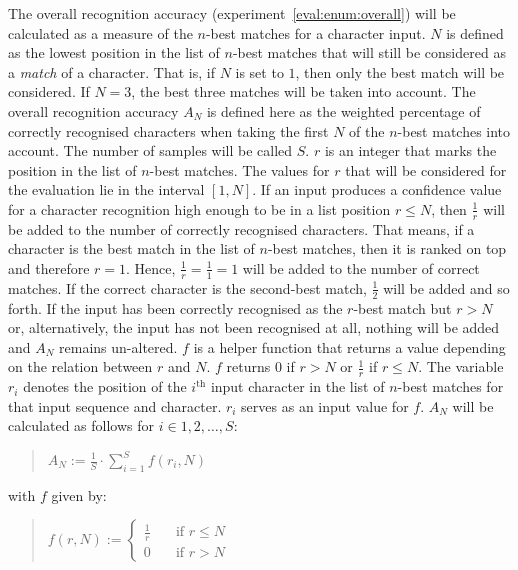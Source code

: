 The overall recognition accuracy (experiment~\ref{eval:enum:overall}) will 
be calculated as a measure of the \(n\)-best matches for a character input. 
\(N\) is defined as the lowest position in the list of \(n\)-best matches 
that will still be considered as a \emph{match} of a character. 
That is, if \(N\) is set to \(1\), then only the best match will be considered.
If \(N = 3\), the best three matches will be taken into account.
The overall recognition accuracy \(A_{N}\) is defined here as the weighted 
percentage of correctly recognised characters when taking the first \(N\) 
of the \(n\)-best matches into account. 
The number of samples will be called \(S\).
\(r\) is an integer that marks the position in the list of \(n\)-best matches.
The values for \(r\) that will be considered for the evaluation lie 
in the interval \([1,N]\). If an input produces a confidence value 
for a character recognition high enough to be in a list position \(r \leq N\), 
then \(\frac{1}{r}\) will be added to the number of correctly 
recognised characters.
That means, if a character is the best match in the list of \(n\)-best matches,
then it is ranked on top and therefore \(r = 1\). 
Hence, \(\frac{1}{r} = \frac{1}{1} = 1\) will be added to the number of 
correct matches. If the correct character is the second-best match, 
\(\frac{1}{2}\) will be added and so forth. If the input has been correctly 
recognised as the \(r\)-best match but \(r > N\) or, alternatively,
the input has not been recognised at all, nothing will be added and
\(A_N\) remains un-altered.
\(f\) is a helper function that returns a value depending on the relation 
between \(r\) and \(N\). \(f\) returns \( 0 \) if \(r > N\) or \(\frac{1}{r}\)
if \(r \leq N \).
The variable \(r_{i}\) denotes the position of the \(i^{\text{th}}\) input 
character in the list of \(n\)-best matches for that input sequence and 
character. \(r_{i}\) serves as an input value for \(f\). \(A_N\) will be 
calculated as follows for \( i \in {1,2,\dots,S}\):
\begin{quote}
  \(
    A_N := \frac{1}{S} \cdot \sum\limits_{i=1}^{S}{f(r_{i},N)}
  \)
\end{quote}\label{eval:accuracycalculation}
with \(f\) given by:
\begin{quote}
  \(
    f(r, N):=
    \begin{cases}
      \frac{1}{r} & \quad \text{if $r \leq N$} \\
      0 & \quad \text{if $r > N$}
    \end{cases}
  \)
\end{quote}
